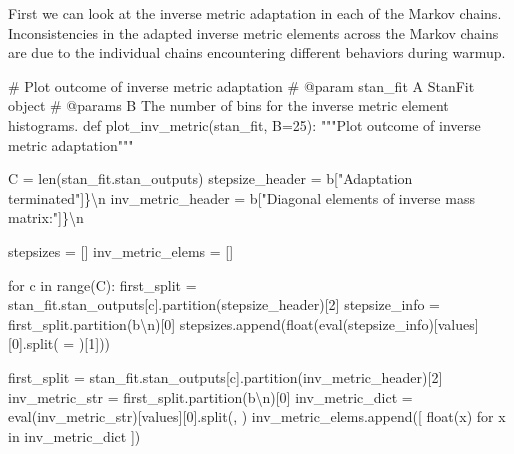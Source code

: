 \documentclass[
  letterpaper,
  DIV=11,
  numbers=noendperiod]{scrartcl}
\newenvironment{Shaded}{\begin{snugshade}}{\end{snugshade}}
\newcommand{\BuiltInTok}[1]{\textcolor[rgb]{0.00,0.23,0.31}{#1}}
\newcommand{\CharTok}[1]{\textcolor[rgb]{0.13,0.47,0.30}{#1}}
\newcommand{\CommentTok}[1]{\textcolor[rgb]{0.37,0.37,0.37}{#1}}
\newcommand{\ControlFlowTok}[1]{\textcolor[rgb]{0.00,0.23,0.31}{#1}}
\newcommand{\DecValTok}[1]{\textcolor[rgb]{0.68,0.00,0.00}{#1}}
\newcommand{\KeywordTok}[1]{\textcolor[rgb]{0.00,0.23,0.31}{#1}}
\newcommand{\NormalTok}[1]{\textcolor[rgb]{0.00,0.23,0.31}{#1}}
\newcommand{\OperatorTok}[1]{\textcolor[rgb]{0.37,0.37,0.37}{#1}}
\newcommand{\StringTok}[1]{\textcolor[rgb]{0.13,0.47,0.30}{#1}}
\begin{document}
First we can look at the inverse metric adaptation in each of the Markov
chains. Inconsistencies in the adapted inverse metric elements across
the Markov chains are due to the individual chains encountering
different behaviors during warmup.

\begin{Shaded}
\begin{Highlighting}[]
\CommentTok{\# Plot outcome of inverse metric adaptation}
\CommentTok{\# @param stan\_fit A StanFit object}
\CommentTok{\# @params B The number of bins for the inverse metric element histograms.}
\KeywordTok{def}\NormalTok{ plot\_inv\_metric(stan\_fit, B}\OperatorTok{=}\DecValTok{25}\NormalTok{):}
  \CommentTok{"""Plot outcome of inverse metric adaptation"""}
  
\NormalTok{  C }\OperatorTok{=} \BuiltInTok{len}\NormalTok{(stan\_fit.stan\_outputs)}
\NormalTok{  stepsize\_header }\OperatorTok{=} \StringTok{b\textquotesingle{}["Adaptation terminated"]\}}\CharTok{\textbackslash{}n}\StringTok{\textquotesingle{}}
\NormalTok{  inv\_metric\_header }\OperatorTok{=} \StringTok{b\textquotesingle{}["Diagonal elements of inverse mass matrix:"]\}}\CharTok{\textbackslash{}n}\StringTok{\textquotesingle{}}
  
\NormalTok{  stepsizes }\OperatorTok{=}\NormalTok{ []}
\NormalTok{  inv\_metric\_elems }\OperatorTok{=}\NormalTok{ []}
  
  \ControlFlowTok{for}\NormalTok{ c }\KeywordTok{in} \BuiltInTok{range}\NormalTok{(C):}
\NormalTok{    first\_split }\OperatorTok{=}\NormalTok{ stan\_fit.stan\_outputs[c].partition(stepsize\_header)[}\DecValTok{2}\NormalTok{]}
\NormalTok{    stepsize\_info }\OperatorTok{=}\NormalTok{ first\_split.partition(}\StringTok{b\textquotesingle{}}\CharTok{\textbackslash{}n}\StringTok{\textquotesingle{}}\NormalTok{)[}\DecValTok{0}\NormalTok{]}
\NormalTok{    stepsizes.append(}\BuiltInTok{float}\NormalTok{(}\BuiltInTok{eval}\NormalTok{(stepsize\_info)[}\StringTok{\textquotesingle{}values\textquotesingle{}}\NormalTok{][}\DecValTok{0}\NormalTok{].split(}\StringTok{\textquotesingle{} = \textquotesingle{}}\NormalTok{)[}\DecValTok{1}\NormalTok{]))}

\NormalTok{    first\_split }\OperatorTok{=}\NormalTok{ stan\_fit.stan\_outputs[c].partition(inv\_metric\_header)[}\DecValTok{2}\NormalTok{]}
\NormalTok{    inv\_metric\_str }\OperatorTok{=}\NormalTok{ first\_split.partition(}\StringTok{b\textquotesingle{}}\CharTok{\textbackslash{}n}\StringTok{\textquotesingle{}}\NormalTok{)[}\DecValTok{0}\NormalTok{]}
\NormalTok{    inv\_metric\_dict }\OperatorTok{=} \BuiltInTok{eval}\NormalTok{(inv\_metric\_str)[}\StringTok{\textquotesingle{}values\textquotesingle{}}\NormalTok{][}\DecValTok{0}\NormalTok{].split(}\StringTok{\textquotesingle{}, \textquotesingle{}}\NormalTok{)}
\NormalTok{    inv\_metric\_elems.append([ }\BuiltInTok{float}\NormalTok{(x) }\ControlFlowTok{for}\NormalTok{ x }\KeywordTok{in}\NormalTok{ inv\_metric\_dict ])}


\end{Highlighting}
\end{Shaded}
\end{document}
